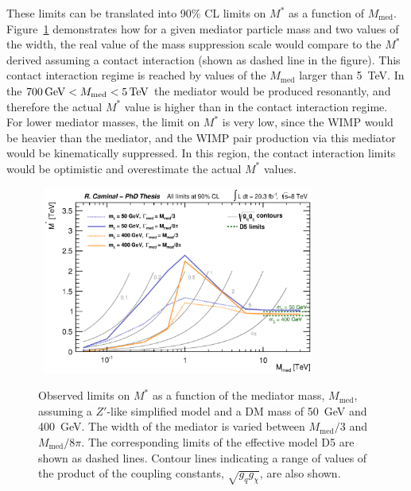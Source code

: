 These limits can be translated into 90\% CL limits on $M^{\ast}$ as a function of $M_{\text{med}}$.
Figure~\ref{fig:WIMPsSimplifiedMstarLimit} demonstrates how for a given mediator particle mass and two values of the width, the real value of the mass suppression scale would compare to the $M^{\ast}$ derived assuming a contact interaction (shown as dashed line in the figure).
This contact interaction regime is reached by values of the $M_{\text{med}}$ larger than 5~TeV.
In the $\unit[700]{GeV} < M_\text{med} < \unit[5]{TeV}$ the mediator would be produced resonantly, and therefore the actual $M^{\ast}$ value is higher than in the contact interaction regime.
For lower mediator masses, the limit on $M^{\ast}$ is very low, since the WIMP would be heavier than the mediator, and the WIMP pair production via this mediator would be kinematically suppressed.
In this region, the contact interaction limits would be optimistic and overestimate the actual $M^{\ast}$ values.

\begin{figure}[!t]
  \begin{center}
    \mbox{
      \includegraphics[width=0.795\textwidth]{Interpretations/Figures/WIMPsimplified_MstarMmed_vector.eps}
    }
  \end{center}
  \caption[Observed limits on $M^{\ast}$ as a function of the mediator mass assuming a $Z'$-like simplified model.]{Observed limits on $M^{\ast}$ as a function of the mediator mass, $M_\text{med}$, assuming a $Z'$-like simplified model and a DM mass of 50~GeV and 400~GeV.
  The width of the mediator is varied between $M_\text{med}/3$ and $M_\text{med}/8\pi$.
  The corresponding limits of the effective model D5 are shown as dashed lines.
  Contour lines indicating a range of values of the product of the coupling constants, $\sqrt{g_q g_\chi}$, are also shown.}
  \label{fig:WIMPsSimplifiedMstarLimit}
\end{figure}

